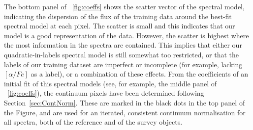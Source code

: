 \documentclass[12pt, preprint]{aastex}
\newcommand{\sectionname}{Section}
\newcommand{\tc}{\textsl{The~Cannon}}
\begin{document}
The bottom panel of \figurename~\ref{fig:coeffs} shows the scatter vector of the spectral model, 
indicating the dispersion of the flux of the training data around the best-fit spectral model at each pixel. 
The scatter is small and this indicates that our model is a good representation of the data. 
However, the scatter is highest where the most information in the spectra are contained. 
This implies that either our quadratic-in-labels spectral model is still somewhat too restricted, or that the labels of our training dataset are imperfect or incomplete 
(for example, lacking $[\alpha / Fe]$ as a label), or a combination of these effects. 
From the coefficients of an initial fit of this spectral models (see, for example, the middle panel of \figurename~\ref{fig:coeffs}), 
the continuum pixels have been determined following \sectionname~\ref{sec:ContNorm}. 
These are marked in the black dots in the top panel of the Figure, and are used for an iterated, 
consistent continuum normalisation for all spectra, both of the reference and of the survey objects.

\end{document}
